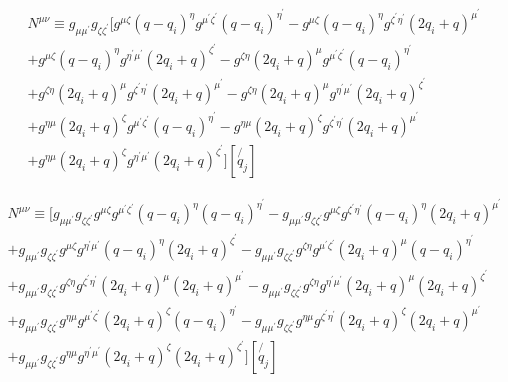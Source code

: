 \begin{equation}
\begin{split}
N^{\mu \nu}\equiv g_{{\mu}{{\mu}^{\prime}}} g_{{\zeta}{{\zeta}^{\prime}}}[g^{{\mu}{\zeta}}(q-q_i)^{\eta}g^{{{\mu}^{\prime}}{{\zeta}^{\prime}}}(q-q_i)^{{\eta}^{\prime}}-g^{{\mu}{\zeta}}(q-q_i)^{\eta}g^{{{\zeta}^{\prime}}{{\eta}^{\prime}}}(2q_i +q)^{{\mu}^{\prime}}\\
+g^{{\mu}{\zeta}}(q-q_i)^{\eta}g^{{{\eta}^{\prime}}{{\mu}^{\prime}}}(2q_i +q)^{{\zeta}^{\prime}}-g^{{\zeta}{\eta}}(2q_i +q)^{\mu}g^{{{\mu}^{\prime}}{{\zeta}^{\prime}}}(q-q_i)^{{\eta}^{\prime}}\\
+g^{{\zeta}{\eta}}(2q_i +q)^{\mu}g^{{{\zeta}^{\prime}}{{\eta}^{\prime}}}(2q_i +q)^{{\mu}^{\prime}}-g^{{\zeta}{\eta}}(2q_i +q)^{\mu}g^{{{\eta}^{\prime}}{{\mu}^{\prime}}}(2q_i +q)^{{\zeta}^{\prime}}\\
+g^{{\eta}{\mu}}(2q_i +q)^{\zeta}g^{{{\mu}^{\prime}}{{\zeta}^{\prime}}}(q-q_i)^{{\eta}^{\prime}}-g^{{\eta}{\mu}}(2q_i +q)^{\zeta}g^{{{\zeta}^{\prime}}{{\eta}^{\prime}}}(2q_i +q)^{{\mu}^{\prime}}\\
+g^{{\eta}{\mu}}(2q_i +q)^{\zeta}g^{{{\eta}^{\prime}}{{\mu}^{\prime}}}(2q_i +q)^{{\zeta}^{\prime}}][\not{q_j}]
\end{split}
\end{equation}

\begin{equation}
\begin{split}
N^{\mu \nu}\equiv 
[g_{{\mu}{{\mu}^{\prime}}} g_{{\zeta}{{\zeta}^{\prime}}}g^{{\mu}{\zeta}}g^{{{\mu}^{\prime}}{{\zeta}^{\prime}}}(q-q_i)^{\eta}(q-q_i)^{{\eta}^{\prime}}
-g_{{\mu}{{\mu}^{\prime}}} g_{{\zeta}{{\zeta}^{\prime}}}g^{{\mu}{\zeta}}g^{{{\zeta}^{\prime}}{{\eta}^{\prime}}}(q-q_i)^{\eta}(2q_i +q)^{{\mu}^{\prime}}\\
+g_{{\mu}{{\mu}^{\prime}}} g_{{\zeta}{{\zeta}^{\prime}}}g^{{\mu}{\zeta}}g^{{{\eta}^{\prime}}{{\mu}^{\prime}}}(q-q_i)^{\eta}(2q_i +q)^{{\zeta}^{\prime}}-g_{{\mu}{{\mu}^{\prime}}} g_{{\zeta}{{\zeta}^{\prime}}}g^{{\zeta}{\eta}}g^{{{\mu}^{\prime}}{{\zeta}^{\prime}}}(2q_i +q)^{\mu}(q-q_i)^{{\eta}^{\prime}}\\
+g_{{\mu}{{\mu}^{\prime}}} g_{{\zeta}{{\zeta}^{\prime}}}g^{{\zeta}{\eta}}g^{{{\zeta}^{\prime}}{{\eta}^{\prime}}}(2q_i +q)^{\mu}(2q_i +q)^{{\mu}^{\prime}}-g_{{\mu}{{\mu}^{\prime}}} g_{{\zeta}{{\zeta}^{\prime}}}g^{{\zeta}{\eta}}g^{{{\eta}^{\prime}}{{\mu}^{\prime}}}(2q_i +q)^{\mu}(2q_i +q)^{{\zeta}^{\prime}}\\
+g_{{\mu}{{\mu}^{\prime}}} g_{{\zeta}{{\zeta}^{\prime}}}g^{{\eta}{\mu}}g^{{{\mu}^{\prime}}{{\zeta}^{\prime}}}(2q_i +q)^{\zeta}(q-q_i)^{{\eta}^{\prime}}-g_{{\mu}{{\mu}^{\prime}}} g_{{\zeta}{{\zeta}^{\prime}}}g^{{\eta}{\mu}}g^{{{\zeta}^{\prime}}{{\eta}^{\prime}}}(2q_i +q)^{\zeta}(2q_i +q)^{{\mu}^{\prime}}\\
+g_{{\mu}{{\mu}^{\prime}}} g_{{\zeta}{{\zeta}^{\prime}}}g^{{\eta}{\mu}}g^{{{\eta}^{\prime}}{{\mu}^{\prime}}}(2q_i +q)^{\zeta}(2q_i +q)^{{\zeta}^{\prime}}][\not{q_j}]
\end{split}
\end{equation}

